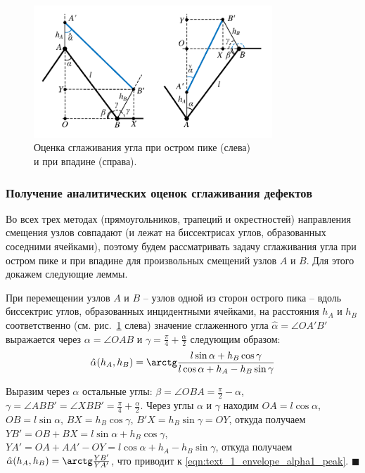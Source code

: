 \begin{figure}[ht]
\centering
\includegraphics[width=0.8\textwidth]{fig/2dr_peak_cavern_general.pdf}
\singlespacing
{}\caption{Оценка сглаживания угла при остром пике (слева) \\ и при впадине (справа).}
\label{fig:text_1_remesh_2d_peak_cavern_general}
\end{figure}

\subsubsection{Получение аналитических оценок сглаживания дефектов}

Во всех трех методах (прямоугольников, трапеций и окрестностей) направления смещения узлов совпадают (и лежат на биссектрисах углов, образованных соседними ячейками), поэтому будем рассматривать задачу сглаживания угла при остром пике и при впадине для произвольных смещений узлов $A$ и $B$.
Для этого докажем следующие леммы.

\begin{lemma}\label{lem:text_1_peak_smooth}
При перемещении узлов $A$ и $B$ -- узлов одной из сторон острого пика -- вдоль биссектрис углов, образованных инцидентными ячейками, на расстояния $h_A$ и $h_B$ соответственно (см. рис.~\ref{fig:text_1_remesh_2d_peak_cavern_general} слева) значение сглаженного угла $\hat{\alpha} = \angle OA'B'$ выражается через $\alpha = \angle OAB$ и $\gamma = \frac{\pi}{4} + \frac{\alpha}{2}$ следующим образом:
\begin{equation}\label{eqn:text_1_envelope_alpha1_peak}
\hat{\alpha}(h_A, h_B) = \arctg \frac{l \sin \alpha + h_B \cos \gamma}{l \cos \alpha + h_A - h_B \sin \gamma}	
\end{equation}
\end{lemma}

Выразим через $\alpha$ остальные углы: $\beta = \angle OBA = \frac{\pi}{2} - \alpha$, $\gamma = \angle ABB' = \angle XBB' = \frac{\pi}{4} + \frac{\alpha}{2}$.
Через углы $\alpha$ и $\gamma$ находим $OA = l \cos \alpha$, $OB = l \sin \alpha$, $BX = h_B \cos \gamma$, $B'X = h_B \sin \gamma = OY$, откуда получаем $YB' = OB + BX = l \sin \alpha + h_B \cos \gamma$, $YA' = OA + AA' - OY = l \cos \alpha + h_A - h_B \sin \gamma$, откуда получаем $\hat{\alpha}(h_A, h_B) = \arctg \frac{YB'}{YA'}$, что приводит к \eqref{eqn:text_1_envelope_alpha1_peak}.
$\blacksquare$\\

